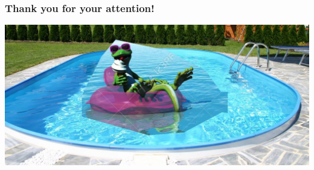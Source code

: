 \documentclass{beamer}
\begin{document}
\begin{frame}
    \frametitle{Thank you for your attention!}
 	\includegraphics[width=\textwidth]{img/important.jpg}
\end{frame}
\end{document}
